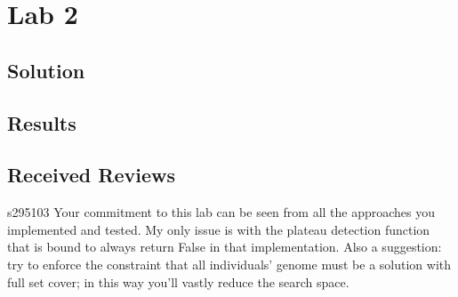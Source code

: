 
\section{Lab 2}

\subsection{Solution}

\subsection{Results}

\subsection{Received Reviews}

\begin{tcolorbox}[colback=green!5!white,colframe=green!75!black,code={\singlespacing}]
    s295103
    \tcblower
    Your commitment to this lab can be seen from all the approaches you implemented and tested.
    My only issue is with the plateau detection function that is bound to always return False in that implementation.
    Also a suggestion: try to enforce the constraint that all individuals' genome must be a solution with full set cover; in this way you'll vastly reduce the search space.
\end{tcolorbox}

